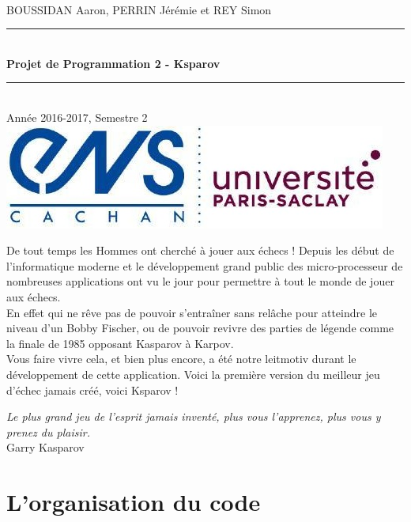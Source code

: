 \documentclass[a4paper]{article}
\newcommand{\HRule}{\rule{\linewidth}{0.5mm}}
\begin{document}
\begin{titlepage}
~\\
BOUSSIDAN Aaron, PERRIN Jérémie et REY Simon\\[5cm]
\begin{center}
\HRule 
\\[0.4cm]{\huge\bfseries Projet de Programmation 2 - Ksparov\\[0.4cm]}
\HRule \\[0.5cm] 
Année 2016-2017, Semestre 2\\[12cm]
\includegraphics[scale=0.7]{Images/Logo_ENS_PS.jpg}
\end{center}
\end{titlepage}
\tableofcontents

\newpage

De tout temps les Hommes ont cherché à jouer aux échecs ! Depuis les début de l'informatique moderne et le développement grand public des micro-processeur de nombreuses applications ont vu le jour pour permettre à tout le monde de jouer aux échecs. \\

En effet qui ne rêve pas de pouvoir s'entraîner sans relâche pour atteindre le niveau d'un Bobby Fischer, ou de pouvoir revivre des parties de légende comme la finale de 1985 opposant Kasparov à Karpov. \\

Vous faire vivre cela, et bien plus encore, a été notre leitmotiv durant le développement de cette application. Voici la première version du meilleur jeu d'échec jamais créé, voici Ksparov !

\begin{flushright}
\textit{Le plus grand jeu de l'esprit jamais inventé, plus vous l'apprenez, plus vous y prenez du plaisir.}\\

Garry Kasparov
\end{flushright}

\section{L'organisation du code}
\end{document}
